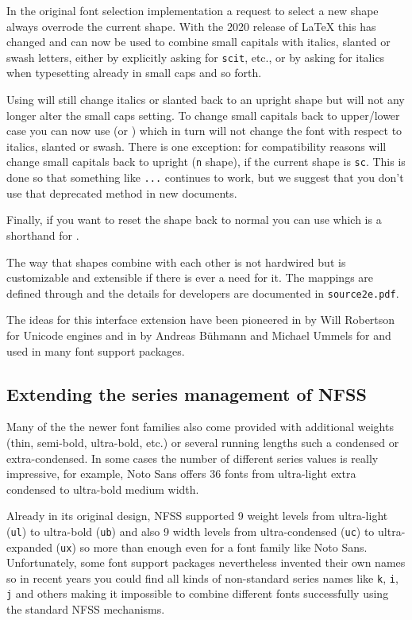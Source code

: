 \documentclass{ltnews}
\providecommand\pdfTeX{\hologo{pdfTeX}}
\begin{document}
In the original font selection implementation a request to select a new shape
always overrode the current shape. With the 2020 release of \LaTeX{}
this has changed and  can now be used to combine small
capitals with italics, slanted or swash letters, either by explicitly
asking for \texttt{scit}, etc., or by asking for italics when typesetting
already in small caps and so forth.

Using  will still change italics or slanted back to an
upright shape but will not any longer alter the small caps setting. To
change small capitals back to upper/lower case you can now use
 (or ) which in turn will not change the font
with respect to italics, slanted or swash.
%
There is one exception: for compatibility reasons  will
change small capitals back to upright (\texttt{n} shape), if the
current shape is \texttt{sc}. This is done so that something like
\allowbreak\texttt{...}\allowbreak{} continues
to work, but we suggest that you don't use that deprecated method in
new documents.

Finally, if you want to
reset the shape back to normal you can use  which is a
shorthand for .

The way that shapes combine with each other is not hardwired but is
customizable and extensible if there is ever a need for it. The
mappings are defined through  and the
details for developers are documented in \texttt{source2e.pdf}.

The ideas for this interface extension have been pioneered in
 by Will Robertson for Unicode engines and in
 by Andreas Bühmann and Michael Ummels for \pdfTeX{} and
used in many font support packages.



\subsection{Extending the series management of NFSS}

Many of the the newer font families also come provided with additional
weights (thin, semi-bold, ultra-bold, etc.\@) or several running lengths
such a condensed or extra-condensed. In some cases the number of
different series values is really impressive, for example, Noto Sans
offers 36 fonts from ultra-light extra condensed to ultra-bold medium width.

Already in its original design, NFSS supported 9 weight levels from
ultra-light (\texttt{ul}) to ultra-bold (\texttt{ub}) and also 9 width
levels from ultra-condensed (\texttt{uc}) to ultra-expanded
(\texttt{ux}) so more than enough even for a font family like Noto
Sans. Unfortunately, some font support packages nevertheless invented
their own names so in recent years you could find all kinds of
non-standard series names like \texttt{k}, \texttt{i}, \texttt{j} and
others making it impossible to combine different fonts successfully
using the standard NFSS mechanisms.
\end{document}
